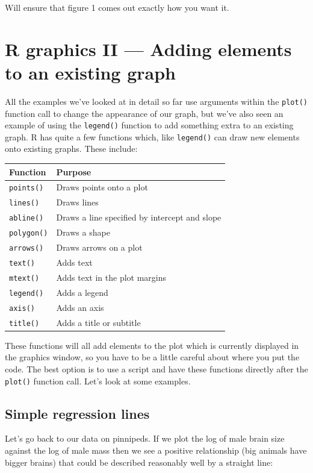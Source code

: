 \documentclass[
]{book}
\begin{document}
Will ensure that figure 1 comes out exactly how you want it.

\hypertarget{r-graphics-ii-adding-elements-to-an-existing-graph}{%
\chapter{R graphics II --- Adding elements to an existing graph}\label{r-graphics-ii-adding-elements-to-an-existing-graph}}

All the examples we've looked at in detail so far use arguments within the \texttt{plot()} function call to change the appearance of our graph, but we've also seen an example of using the \texttt{legend()} function to add something extra to an existing graph. R has quite a few functions which, like \texttt{legend()} can draw new elements onto existing graphs. These include:

\begin{longtable}[]{@{}ll@{}}
\toprule
Function & Purpose\tabularnewline
\midrule
\endhead
\texttt{points()} & Draws points onto a plot\tabularnewline
\texttt{lines()} & Draws lines\tabularnewline
\texttt{abline()} & Draws a line specified by intercept and slope\tabularnewline
\texttt{polygon()} & Draws a shape\tabularnewline
\texttt{arrows()} & Draws arrows on a plot\tabularnewline
\texttt{text()} & Adds text\tabularnewline
\texttt{mtext()} & Adds text in the plot margins\tabularnewline
\texttt{legend()} & Adds a legend\tabularnewline
\texttt{axis()} & Adds an axis\tabularnewline
\texttt{title()} & Adds a title or subtitle\tabularnewline
\bottomrule
\end{longtable}

These functions will all add elements to the plot which is currently displayed in the graphics window, so you have to be a little careful about where you put the code. The best option is to use a script and have these functions directly after the \texttt{plot()} function call. Let's look at some examples.

\hypertarget{simple-regression-lines}{%
\section{Simple regression lines}\label{simple-regression-lines}}

Let's go back to our data on pinnipeds. If we plot the log of male brain size against the log of male mass then we see a positive relationship (big animals have bigger brains) that could be described reasonably well by a straight line:
\end{document}
